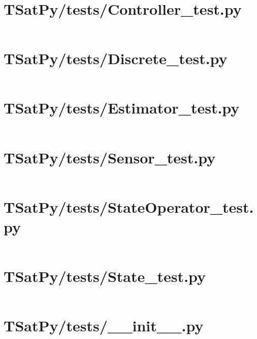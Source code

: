 \pagebreak
\section*{TSatPy/tests/Controller\_test.py}\label{code:TSatPy/tests/Controller_test.py}
\inputminted[linenos,fontsize=\scriptsize]{python}{/home/dcouture/git/mathyourlife/TSatPy/TSatPy/tests/Controller_test.py}

\pagebreak
\section*{TSatPy/tests/Discrete\_test.py}\label{code:TSatPy/tests/Discrete_test.py}
\inputminted[linenos,fontsize=\scriptsize]{python}{/home/dcouture/git/mathyourlife/TSatPy/TSatPy/tests/Discrete_test.py}

\pagebreak
\section*{TSatPy/tests/Estimator\_test.py}\label{code:TSatPy/tests/Estimator_test.py}
\inputminted[linenos,fontsize=\scriptsize]{python}{/home/dcouture/git/mathyourlife/TSatPy/TSatPy/tests/Estimator_test.py}

\pagebreak
\section*{TSatPy/tests/Sensor\_test.py}\label{code:TSatPy/tests/Sensor_test.py}
\inputminted[linenos,fontsize=\scriptsize]{python}{/home/dcouture/git/mathyourlife/TSatPy/TSatPy/tests/Sensor_test.py}

\pagebreak
\section*{TSatPy/tests/StateOperator\_test.py}\label{code:TSatPy/tests/StateOperator_test.py}
\inputminted[linenos,fontsize=\scriptsize]{python}{/home/dcouture/git/mathyourlife/TSatPy/TSatPy/tests/StateOperator_test.py}

\pagebreak
\section*{TSatPy/tests/State\_test.py}\label{code:TSatPy/tests/State_test.py}
\inputminted[linenos,fontsize=\scriptsize]{python}{/home/dcouture/git/mathyourlife/TSatPy/TSatPy/tests/State_test.py}

\pagebreak
\section*{TSatPy/tests/\_\_init\_\_.py}\label{code:TSatPy/tests/__init__.py}
\inputminted[linenos,fontsize=\scriptsize]{python}{/home/dcouture/git/mathyourlife/TSatPy/TSatPy/tests/__init__.py}

